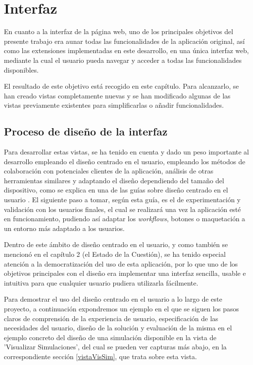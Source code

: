 \chapter{Interfaz}
\label{cap:interfaz}

En cuanto a la interfaz de la página web, uno de los principales objetivos del presente trabajo era aunar todas las funcionalidades de la aplicación original, así como las extensiones implementadas en este desarrollo, en una única interfaz web, mediante la cual el usuario pueda navegar y acceder a todas las funcionalidades disponibles.

El resultado de este objetivo está recogido en este capítulo. Para alcanzarlo, se han creado vistas completamente nuevas y se han modificado algunas de las vistas previamente existentes para simplificarlas o añadir funcionalidades.

\section{Proceso de diseño de la interfaz}

Para desarrollar estas vistas, se ha tenido en cuenta y dado un peso importante al desarrollo empleando el diseño centrado en el usuario, empleando los métodos de colaboración con potenciales clientes de la aplicación, análisis de otras herramientas similares y adaptando el diseño dependiendo del tamaño del dispositivo, como se explica en una de las guías sobre diseño centrado en el usuario \citep{pratt2012interactive}. El siguiente paso a tomar, según esta guía, es el de experimentación y validación con los usuarios finales, el cual se realizará una vez la aplicación esté en funcionamiento, pudiendo así adaptar los \textit{workflows}, botones o maquetación a un entorno más adaptado a los usuarios.

Dentro de este ámbito de diseño centrado en el usuario, y como también se mencionó en el capítulo 2 (el Estado de la Cuestión), se ha tenido especial atención a la democratización del uso de esta aplicación, por lo que uno de los objetivos principales con el diseño era implementar una interfaz sencilla, usable e intuitiva para que cualquier usuario pudiera utilizarla fácilmente.

Para demostrar el uso del diseño centrado en el usuario a lo largo de este proyecto, a continuación expondremos un ejemplo en el que se siguen los pasos claros de comprensión de la experiencia de usuario, especificación de las necesidades del usuario, diseño de la solución y evaluación de la misma en el ejemplo concreto del diseño de una simulación disponible en la vista de 'Visualizar Simulaciones', del cual se pueden ver capturas más abajo, en la correspondiente sección \ref{vistaVisSim}, que trata sobre esta vista.

